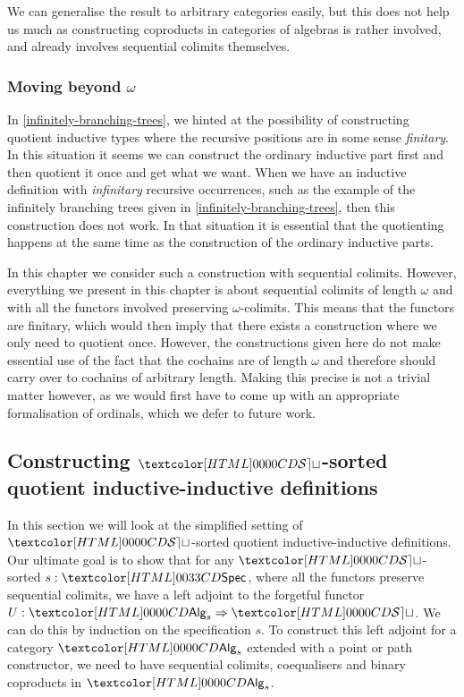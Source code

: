 We can generalise the result to arbitrary categories easily, but this
does not help us much as constructing coproducts in categories of
algebras is rather involved, and already involves sequential colimits
themselves.

\subsubsection{Moving beyond $\omega$}

In \cref{infinitely-branching-trees}, we hinted at the possibility of
constructing quotient inductive types where the recursive positions
are in some sense \emph{finitary}. In this situation it seems we can
construct the ordinary inductive part first and then quotient it once
and get what we want. When we have an inductive definition with
\emph{infinitary} recursive occurrences, such as the example of the
infinitely branching trees given in \cref{infinitely-branching-trees},
then this construction does not work. In that situation it is
essential that the quotienting happens at the same time as the
construction of the ordinary inductive parts.

In this chapter we consider such a construction with sequential
colimits. However, everything we present in this chapter is about
sequential colimits of length $\omega$ and with all the functors
involved preserving $\omega$-colimits. This means that the functors
are finitary, which would then imply that there exists a construction
where we only need to quotient once. However, the constructions given
here do not make essential use of the fact that the cochains are of
length $\omega$ and therefore should carry over to cochains of
arbitrary length. Making this precise is not a trivial matter however,
as we would first have to come up with an appropriate formalisation of
ordinals, which we defer to future work.

\subsection{Constructing $\SET$-sorted quotient inductive-inductive definitions}

In this section we will look at the simplified setting of $\SET$-sorted quotient
inductive-inductive definitions. Our ultimate goal is to show that for
any $\SET$-sorted $s : \specty$, where all the functors preserve
sequential colimits, we have a left adjoint to the forgetful functor
$U : \Func{\Alg_s}{\SET}$. We can do this by induction on the
specification $s$. To construct this left adjoint for a category
$\Alg_s$ extended with a point or path constructor, we need to have
sequential colimits, coequalisers and binary coproducts in $\Alg_s$.

